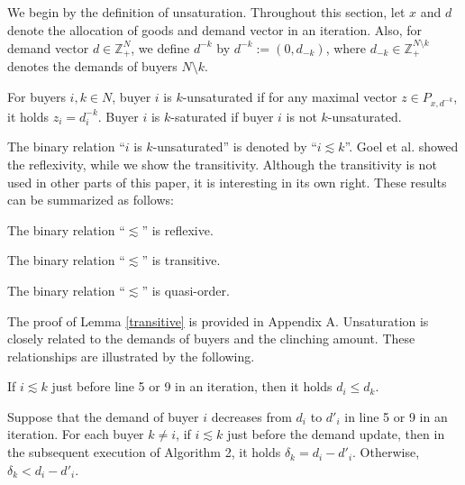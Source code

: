 \documentclass[letterpaper,11pt]{article}
\begin{document}
We begin by the definition of unsaturation. 
Throughout this section, 
let $x$ and $d$ denote the allocation of goods and demand vector in an iteration.
Also, for demand vector $d\in \mathbb Z_+^N$, we define $d^{-k}$ by $d^{-k}:=(0, d_{-k})$,
where $d_{-k}\in \mathbb Z^{N\setminus k}_{+}$ denotes the demands of buyers $N\setminus k$.

\begin{definition}
\label{unsaturation}
{\rm For buyers $i,k\in N$, buyer $i$ is} $k$-unsaturated {\rm if for any maximal vector 
$z\in P_{x,d^{-k}}$, it holds $z_i =d^{-k}_i$. 
Buyer $i$ is} $k$-saturated {\rm if buyer $i$ is not $k$-unsaturated.}
\end{definition}

The binary relation ``$i$ is $k$-unsaturated'' is denoted by ``$i \lesssim k$''.
Goel et al. \cite{GMP2014} showed the reflexivity, 
while we show the transitivity.
Although the transitivity is not used in other parts of this paper, it is interesting in its own right.
These results can be summarized as follows: 
\begin{lemma}
\label{reflexive}
The binary relation ``$\lesssim$'' is reflexive.
\end{lemma}
\begin{lemma}
\label{transitive}
The binary relation ``$\lesssim$'' is transitive.
\end{lemma}
\begin{corollary}
\label{quasi_order}
The binary relation ``$\lesssim$'' is quasi-order.
\end{corollary}

The proof of Lemma \ref{transitive} is provided in Appendix A.
Unsaturation is closely related to the demands of buyers and the clinching amount.
These relationships are illustrated by the following.

\begin{lemma}
\label{unsaturation_demand}
	If $i\lesssim k$ just before line 5 or 9 in an iteration, then it holds $d_i\leq d_k$.
\end{lemma}
\begin{proposition}
	\label{unsaturation_clinch}
	Suppose that the demand of buyer $i$ decreases from $d_i$ to $d'_i$
	in line 5 or 9 in an iteration.
	For each buyer $k\neq i$, 
	if $i\lesssim k$ just before the demand update, 
	then in the subsequent execution of Algorithm 2, 
	it holds $\delta_k =d_i-d'_i$.
	Otherwise, $\delta_k<d_i-d'_i$.
\end{proposition}
\end{document}
